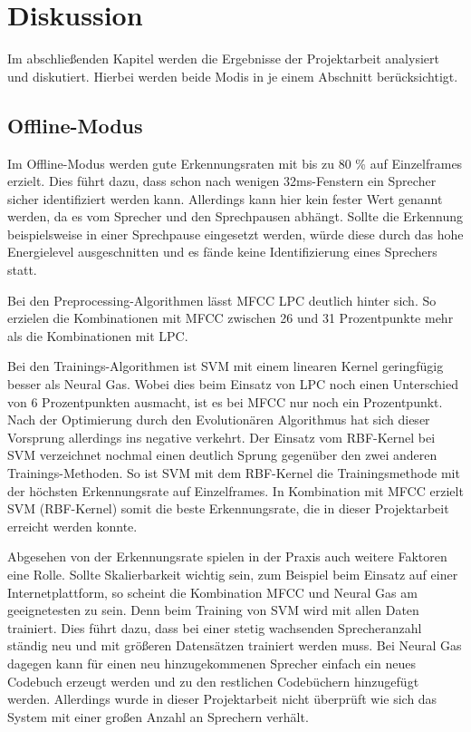 \chapter{Diskussion}
Im abschließenden Kapitel werden die Ergebnisse der Projektarbeit analysiert und diskutiert. Hierbei werden beide Modis in je einem Abschnitt berücksichtigt.

\section{Offline-Modus}
Im Offline-Modus werden gute Erkennungsraten mit bis zu 80 \% auf Einzelframes erzielt. Dies führt dazu, dass schon nach wenigen 32ms-Fenstern ein Sprecher sicher identifiziert werden kann. Allerdings kann hier kein fester Wert genannt werden, da es vom Sprecher und den Sprechpausen abhängt. Sollte die Erkennung beispielsweise in einer Sprechpause eingesetzt werden, würde diese durch das hohe Energielevel ausgeschnitten und es fände keine Identifizierung eines Sprechers statt.

Bei den Preprocessing-Algorithmen lässt MFCC LPC deutlich hinter sich. So erzielen die Kombinationen mit MFCC zwischen 26 und 31 Prozentpunkte mehr als die Kombinationen mit LPC.

Bei den Trainings-Algorithmen ist SVM mit einem linearen Kernel geringfügig besser als Neural Gas. Wobei dies beim Einsatz von LPC noch einen Unterschied von 6 Prozentpunkten ausmacht, ist es bei MFCC nur noch ein Prozentpunkt. Nach der Optimierung durch den Evolutionären Algorithmus hat sich dieser Vorsprung allerdings ins negative verkehrt. Der Einsatz vom RBF-Kernel bei SVM verzeichnet nochmal einen deutlich Sprung gegenüber den zwei anderen Trainings-Methoden. So ist SVM mit dem RBF-Kernel die Trainingsmethode mit der höchsten Erkennungsrate auf Einzelframes. In Kombination mit MFCC erzielt SVM (RBF-Kernel) somit die beste Erkennungsrate, die in dieser Projektarbeit erreicht werden konnte.

Abgesehen von der Erkennungsrate spielen in der Praxis auch weitere Faktoren eine Rolle. Sollte Skalierbarkeit wichtig sein, zum Beispiel beim Einsatz auf einer Internetplattform, so scheint die Kombination MFCC und Neural Gas am geeignetesten zu sein. Denn beim Training von SVM wird mit allen Daten trainiert. Dies führt dazu, dass bei einer stetig wachsenden Sprecheranzahl ständig neu und mit größeren Datensätzen trainiert werden muss. Bei Neural Gas dagegen kann für einen neu hinzugekommenen Sprecher einfach ein neues Codebuch erzeugt werden und zu den restlichen Codebüchern hinzugefügt werden. Allerdings wurde in dieser Projektarbeit nicht überprüft wie sich das System mit einer großen Anzahl an Sprechern verhält.

